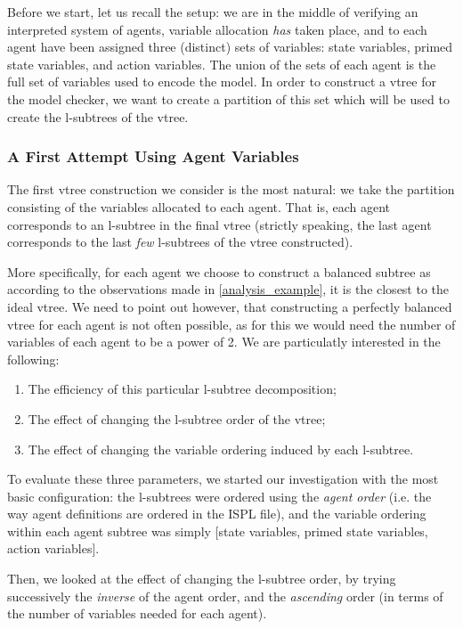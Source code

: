 \documentclass[11pt]{article}
\begin{document}
Before we start, let us recall the setup: we are in the middle of verifying an interpreted system of agents, variable allocation \textit{has} taken place, and to each agent have been assigned three (distinct) sets of variables: state variables, primed state variables, and action variables. The union of the sets of each agent is the full set of variables used to encode the model. In order to construct a vtree for the model checker, we want to create a partition of this set which will be used to create the l-subtrees of the vtree. 

\subsubsection{A First Attempt Using Agent Variables}
\label{first_attempt}

The first vtree construction we consider is the most natural: we take the partition consisting of the variables allocated to each agent. That is, each agent corresponds to an l-subtree in the final vtree (strictly speaking, the last agent corresponds to the last \textit{few }l-subtrees of the vtree constructed). 

More specifically, for each agent we choose to construct a balanced subtree as according to the observations made in \ref{analysis_example}, it is the closest to the ideal vtree. We need to point out however, that constructing a perfectly balanced vtree for each agent is not often possible, as for this we would need the number of variables of each agent to be a power of 2.
We are particulatly interested in the following: \begin{enumerate}
\item The efficiency of this particular l-subtree decomposition;
\item The effect of changing the l-subtree order of the vtree;
\item The effect of changing the variable ordering induced by each l-subtree. 
\end{enumerate}
To evaluate these three parameters, we started our investigation with the most basic configuration: the l-subtrees were ordered using the \textit{agent order} (i.e. the way agent definitions are ordered in the ISPL file), and the variable ordering within each agent subtree was simply [state variables, primed state variables, action variables].

Then, we looked at the effect of changing the l-subtree order, by trying successively the \textit{inverse} of the agent order, and the \textit{ascending }order (in terms of the number of variables needed for each agent).
\end{document}
